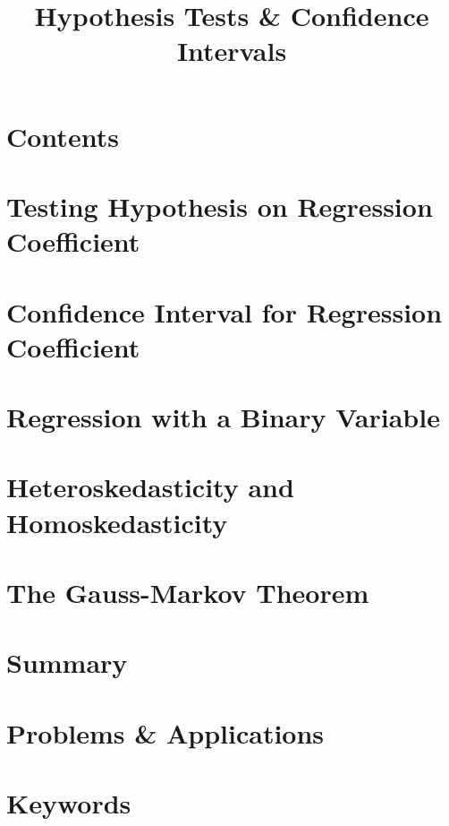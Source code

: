 \title[Testing]{Hypothesis Tests \& Confidence Intervals}
\date{}




\section{Contents}

\section{Testing Hypothesis on Regression Coefficient}

\section{Confidence Interval for Regression Coefficient}

\section{Regression with a Binary Variable}

\section{Heteroskedasticity and Homoskedasticity}

\section{The Gauss-Markov Theorem}

\section{Summary}

\section{Problems \& Applications}

\section<handout>{Keywords}

